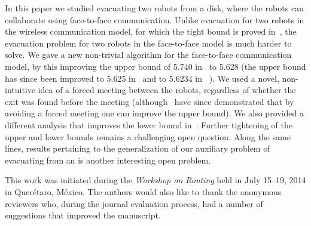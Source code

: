 \documentclass[
final
]{dmtcs-episciences}
\newcommand{\ff}{face-to-face }
\theoremstyle{definition}
\begin{document}
In this paper we studied evacuating two robots from a disk, where the robots 
can collaborate using \ff communication.
Unlike evacuation for two robots in the wireless communication
model, for which the tight bound 
is proved in~\cite{CGGKMP}, the evacuation problem for two robots in
the \ff model is much harder to solve.
We gave a new non-trivial algorithm for the  \ff communication
model, by this improving the upper bound of 5.740
in~\cite{CGGKMP} to 
5.628
(the upper bound has since been improved 
to 5.625 in~\cite{Watten2017}
and to 5.6234 in~\cite{disser2019evacuating}
).
We used a novel, non-intuitive idea of a forced meeting between the robots, 
regardless of whether the exit was found before the meeting (although~\cite{Watten2017,disser2019evacuating} have since demonstrated that by avoiding a forced meeting one can improve the upper bound). 
We also provided a different analysis that improves the lower bound in~\cite{CGGKMP}.
Further tightening of the upper and lower bounds remains a challenging open question. Along the same lines, results pertaining to the generalization of our auxiliary problem of evacuating from an  is another interesting open problem. 


\acknowledgements
\label{sec:ack}
This work was initiated during the \emph{ Workshop on Routing} held in July 15--19,
2014 in Quer\'{e}taro, M\'{e}xico.
The authors would also like to thank the anonymous reviewers who, during the journal evaluation process, had a number of suggestions that improved the manuscript. 

\nocite{*}


\label{sec:biblio}
\end{document}
